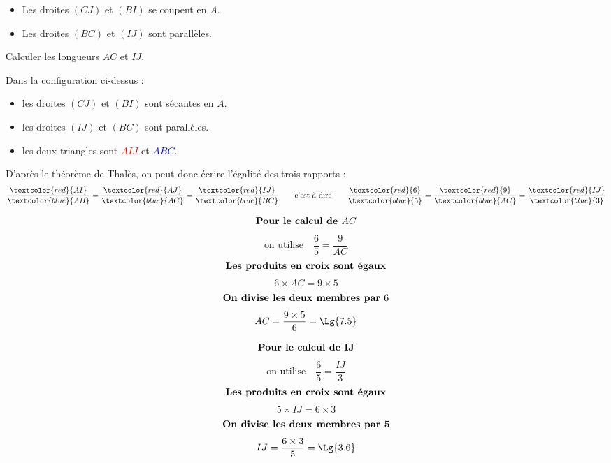 \begin{methode*1}
\begin{minipage}{8cm}
            \end{minipage}
            \begin{minipage}{8cm}
                \begin{itemize}
                    \item Les droites $(CJ)$ et $(BI)$ se coupent en $A$.
                    \item Les droites $(BC)$ et $(IJ)$ sont parallèles.
                \end{itemize}
                Calculer les longueurs $AC$ et $IJ$.
            \end{minipage}
            
            \correction
            Dans la configuration ci-dessus : 
            \begin{itemize}
                \item les droites $(CJ)$ et $(BI)$ sont sécantes en $A$.
                \item les droites $(IJ)$ et $(BC)$ sont parallèles.
                \item les deux triangles sont \textcolor{red}{$AIJ$} et \textcolor{blue}{$ABC$}.
            \end{itemize}
            D'après le théorème de Thalès, on peut donc écrire l'égalité des trois rapports :
            $$\frac{\textcolor{red}{AI}}{\textcolor{blue}{AB}}=\frac{\textcolor{red}{AJ}}{\textcolor{blue}{AC}}=\frac{\textcolor{red}{IJ}}{\textcolor{blue}{BC}}\qquad\mbox{c'est à dire}\qquad\frac{\textcolor{red}{6}}{\textcolor{blue}{5}}=\frac{\textcolor{red}{9}}{\textcolor{blue}{AC}}=\frac{\textcolor{red}{IJ}}{\textcolor{blue}{3}}$$

            \begin{minipage}{8cm}
                $$\mbox{\bf Pour le calcul de $AC$}$$
                $$\mbox{on utilise} \quad \dfrac{6}{5}=\dfrac{9}{AC}$$
                $$\mbox{\bf Les produits en croix sont égaux}$$
                $$6\times AC=9\times5$$
                $$\mbox{\bf On divise les deux membres par $6$}$$
                $$AC=\frac{9\times5}{6}=\Lg{7.5}$$
            \end{minipage}
            \vrule
            \begin{minipage}{8cm}                
                $$\mbox{\bf Pour le calcul de IJ}$$
                $$\mbox{on utilise} \quad \dfrac{6}{5}=\dfrac{IJ}{3}$$
                $$\mbox{\bf Les produits en croix sont égaux}$$                
                $$5\times IJ=6\times3$$
                $$\mbox{\bf On divise les deux membres par 5}$$
                $$IJ=\frac{6\times3}{5}=\Lg{3.6}$$                
            \end{minipage}
        \end{methode*1}

